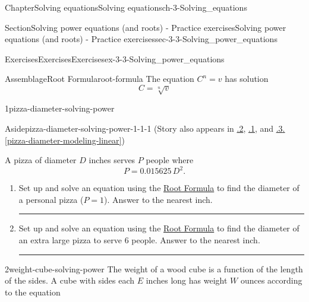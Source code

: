 \documentclass[twoside,11pt,]{book}
\newcommand{\xreffont}{\relax}
\newlength{\workspacestrutwidth}
\numberwithin{equation}{section}
\begin{document}
\begin{chapterptx}{Chapter}{Solving equations}{}{Solving equations}{}{}{ch-3-Solving_equations}
\begin{sectionptx}{Section}{Solving power equations (and roots) - Practice exercises}{}{Solving power equations (and roots) - Practice exercises}{}{}{sec-3-3-Solving_power_equations}
%
%
\typeout{************************************************}
\typeout{************************************************}
%
\begin{exercises-subsection-numberless}{Exercises}{Exercises}{}{Exercises}{}{}{ex-3-3-Solving_power_equations}
\begin{assemblage}{Assemblage}{Root Formula}{root-formula}%
The equation \(C^n=v\) has solution%
\begin{equation*}
C= \sqrt[n]{v}
\end{equation*}
%
\end{assemblage}
\clearpage
\begin{divisionexercise}{1}{}{}{pizza-diameter-solving-power}%
\begin{aside}{Aside}{}{pizza-diameter-solving-power-1-1-1}%
(Story also appears in \hyperlink{pizza-diameter-powers-roots}{{\xreffont 0.6.2}}, \hyperlink{pizza-diameter-approx-solutions}{{\xreffont 2.4.1}}, and \hyperref[pizza-diameter-modeling-linear]{{\xreffont 4.1.3}.{\xreffont\ref{pizza-diameter-modeling-linear}}})%
\end{aside}
 A pizza of diameter \(D\) inches serves \(P\) people where%
\begin{equation*}
P = 0.015625\, D^2.
\end{equation*}
%
\begin{enumerate}[label=(\alph*),ref=\alph*]%
\item{}Set up and solve an equation using the \hyperref[root-formula]{Root Formula} to find the diameter of a personal pizza (\(P=1\)). Answer to the nearest inch.%
\par\rule{\workspacestrutwidth}{2.5in}%
\item{}Set up and solve an equation using the \hyperref[root-formula]{Root Formula} to find the diameter of an extra large pizza to serve 6 people. Answer to the nearest inch.%
\par\rule{\workspacestrutwidth}{2.5in}%
\end{enumerate}%
\end{divisionexercise}%
\clearpage
\begin{divisionexercise}{2}{}{}{weight-cube-solving-power}%
The weight of a wood cube is a function of the length of the sides. A cube with sides each \(E\) inches long has weight \(W\) ounces according to the equation%

\end{divisionexercise}
\end{exercises-subsection-numberless}
\end{sectionptx}
\end{chapterptx}
\end{document}
